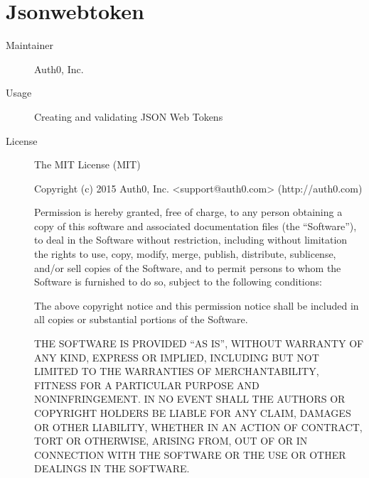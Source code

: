   \section*{Jsonwebtoken}
    \begin{description}
      \item[Maintainer] Auth0, Inc.
      \item[Usage] Creating and validating JSON Web Tokens
      \item[License] \scriptsize The MIT License (MIT)

        Copyright (c) 2015 Auth0, Inc. <support@auth0.com> (http://auth0.com)
         
        Permission is hereby granted, free of charge, to any person obtaining a copy
        of this software and associated documentation files (the ``Software''), to deal
        in the Software without restriction, including without limitation the rights
        to use, copy, modify, merge, publish, distribute, sublicense, and/or sell
        copies of the Software, and to permit persons to whom the Software is
        furnished to do so, subject to the following conditions:
         
        The above copyright notice and this permission notice shall be included in all
        copies or substantial portions of the Software.
         
        THE SOFTWARE IS PROVIDED ``AS IS'', WITHOUT WARRANTY OF ANY KIND, EXPRESS OR
        IMPLIED, INCLUDING BUT NOT LIMITED TO THE WARRANTIES OF MERCHANTABILITY,
        FITNESS FOR A PARTICULAR PURPOSE AND NONINFRINGEMENT. IN NO EVENT SHALL THE
        AUTHORS OR COPYRIGHT HOLDERS BE LIABLE FOR ANY CLAIM, DAMAGES OR OTHER
        LIABILITY, WHETHER IN AN ACTION OF CONTRACT, TORT OR OTHERWISE, ARISING FROM,
        OUT OF OR IN CONNECTION WITH THE SOFTWARE OR THE USE OR OTHER DEALINGS IN THE
        SOFTWARE.
    \end{description}

